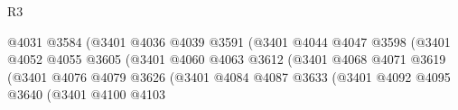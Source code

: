 \begin{lexlean}{R3}
\begin{coremodule}
                                                        @4031
                                                        @3584
                                                        (@3401
                                                          @4036
                                                          @4039
                                                          @3591
                                                          (@3401
                                                            @4044
                                                            @4047
                                                            @3598
                                                            (@3401
                                                              @4052
                                                              @4055
                                                              @3605
                                                              (@3401
                                                                @4060
                                                                @4063
                                                                @3612
                                                                (@3401
                                                                  @4068
                                                                  @4071
                                                                  @3619
                                                                  (@3401
                                                                    @4076
                                                                    @4079
                                                                    @3626
                                                                    (@3401
                                                                      @4084
                                                                      @4087
                                                                      @3633
                                                                      (@3401
                                                                        @4092
                                                                        @4095
                                                                        @3640
                                                                        (@3401
                                                                          @4100
                                                                          @4103

\end{coremodule}
\end{lexlean}
